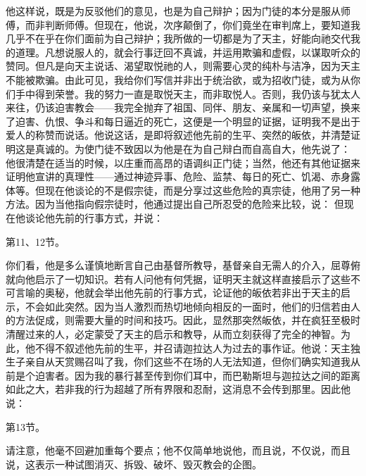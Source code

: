 他这样说，既是为反驳他们的意见，也是为自己辩护；因为门徒的本分是服从师傅，而非判断师傅。但现在，他说，次序颠倒了，你们竟坐在审判席上，要知道我几乎不在乎在你们面前为自己辩护；我所做的一切都是为了天主，好能向祂交代我的道理。凡想说服人的，就会行事迂回不真诚，并运用欺骗和虚假，以谋取听众的赞同。但凡是向天主说话、渴望取悦祂的人，则需要心灵的纯朴与洁净，因为天主不能被欺骗。由此可见，我给你们写信并非出于统治欲，或为招收门徒，或为从你们手中得到荣誉。我的努力一直是取悦天主，而非取悦人。否则，我仍该与犹太人来往，仍该迫害教会——我完全抛弃了祖国、同伴、朋友、亲属和一切声望，换来了迫害、仇恨、争斗和每日逼近的死亡，这便是一个明显的证据，证明我不是出于爱人的称赞而说话。他说这话，是即将叙述他先前的生平、突然的皈依，并清楚证明这是真诚的。为使门徒不致因以为他是在为自己辩白而自高自大，他先说了： 他很清楚在适当的时候，以庄重而高昂的语调纠正门徒；当然，他还有其他证据来证明他宣讲的真理性——通过神迹异事、危险、监禁、每日的死亡、饥渴、赤身露体等。但现在他谈论的不是假宗徒，而是分享过这些危险的真宗徒，他用了另一种方法。因为当他指向假宗徒时，他通过提出自己所忍受的危险来比较，说：  但现在他谈论他先前的行事方式，并说：\par

第11、12节。\par

你们看，他是多么谨慎地断言自己由基督所教导，基督亲自无需人的介入，屈尊俯就向他启示了一切知识。若有人问他有何凭据，证明天主就这样直接启示了这些不可言喻的奥秘，他就会举出他先前的行事方式，论证他的皈依若非出于天主的启示，不会如此突然。因为当人激烈而热切地倾向相反的一面时，他们的归信若由人的方法促成，则需要大量的时间和技巧。因此，显然那突然皈依，并在疯狂至极时清醒过来的人，必定蒙受了天主的启示和教导，从而立刻获得了完全的神智。为此，他不得不叙述他先前的生平，并召请迦拉达人为过去的事作证。他说：天主独生子亲自从天赏赐召叫了我，你们这些不在场的人无法知道，但你们确实知道我从前是个迫害者。因为我的暴行甚至传到你们耳中，而巴勒斯坦与迦拉达之间的距离如此之大，若非我的行为超越了所有界限和忍耐，这消息不会传到那里。因此他说：\par

第13节。 \par

请注意，他毫不回避加重每个要点；他不仅简单地说他，而且说，不仅说，而且说，这表示一种试图消灭、拆毁、破坏、毁灭教会的企图。\par

